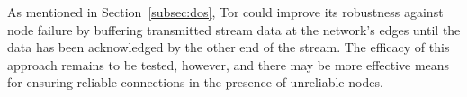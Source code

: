 \documentclass[times,10pt,twocolumn]{article}
\begin{document}
As mentioned in Section~\ref{subsec:dos}, Tor could improve its
robustness against node failure by buffering transmitted stream data
at the network's edges until the data has been acknowledged by the
other end of the stream.  The efficacy of this approach remains to be
tested, however, and there may be more effective means for ensuring
reliable connections in the presence of unreliable nodes.

%



\end{document}
